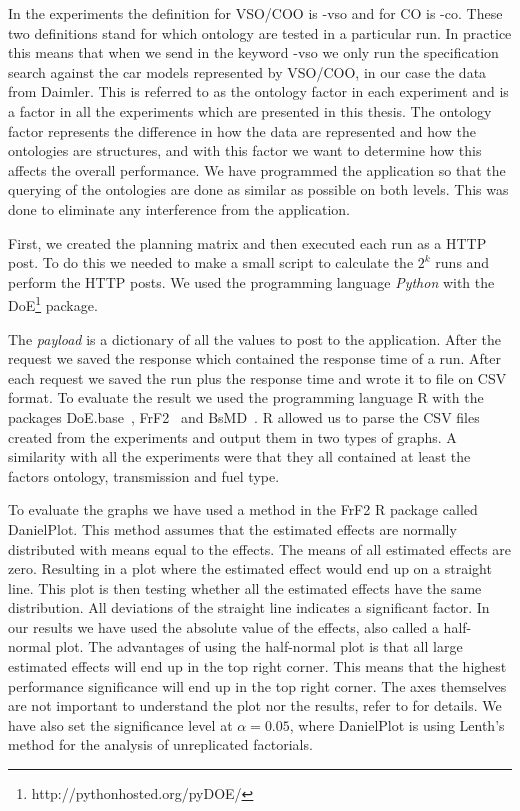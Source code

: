 \documentclass{llncs}
\begin{document}
In the experiments the definition for VSO/COO is \textsf{-vso} and for
CO is \textsf{-co}.  These two definitions stand for which ontology
are tested in a particular run. In practice this means that when we
send in the keyword \textsf{-vso} we only run the specification search
against the car models represented by VSO/COO, in our case the data
from Daimler. This is referred to as the ontology factor in each
experiment and is a factor in all the experiments which are presented
in this thesis. The ontology factor represents the difference in how
the data are represented and how the ontologies are structures, and
with this factor we want to determine how this affects the overall
performance.  We have programmed the application so that the querying
of the ontologies are done as similar as possible on both levels. This
was done to eliminate any interference from the application.

First, we created the planning matrix and then executed each run as a
HTTP post. To do this we needed to make a small script to calculate
the $2^k$ runs and perform the HTTP posts. We used the programming
language \emph{Python} with the
DoE\footnote{http://pythonhosted.org/pyDOE/} package.

The \emph{payload} is a dictionary of all the values to post to the
application.  After the request we saved the response which contained
the response time of a run. After each request we saved the run plus
the response time and wrote it to file on CSV format. To evaluate the
result we used the programming language R with the packages
\textsf{DoE.base}~\cite{DoEBase}, \textsf{FrF2}~\cite{FrF2} and
\textsf{BsMD}~\cite{BsMD}. R allowed us to parse the CSV files created
from the experiments and output them in two types of graphs.  A
similarity with all the experiments were that they all contained at
least the factors ontology, transmission and fuel type.

To evaluate the graphs we have used a method in the \textsf{FrF2} R
package called \textsf{DanielPlot}. This method assumes that the
estimated effects are normally distributed with means equal to the
effects. The means of all estimated effects are zero. Resulting in a
plot where the estimated effect would end up on a straight line. This
plot is then testing whether all the estimated effects have the same
distribution. All deviations of the straight line indicates a
significant factor. In our results we have used the absolute value of
the effects, also called a half-normal plot. The advantages of using
the half-normal plot is that all large estimated effects will end up
in the top right corner. This means that the highest performance
significance will end up in the top right corner. The
axes themselves are not important to understand the plot nor the
results, refer to \cite{PlanExp} for details.
We have also set  the significance level at $\alpha =
0.05$, where \textsf{DanielPlot} is using Lenth's method for the
analysis of unreplicated factorials.
\end{document}
